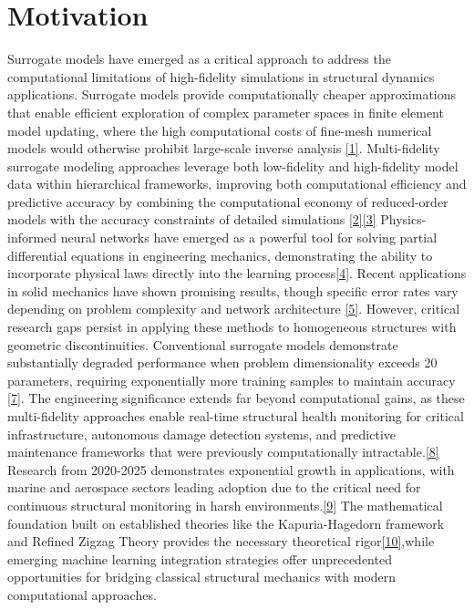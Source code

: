 \documentclass[12pt,a4paper]{report}
\begin{document}
\section{Motivation}
\label{sec:motivation}
Surrogate models have emerged as a critical approach to address the computational limitations of high-fidelity simulations in structural dynamics applications. Surrogate models provide computationally cheaper approximations that enable efficient exploration of complex parameter spaces in finite element model updating, where the high computational costs of fine-mesh numerical models would otherwise prohibit large-scale inverse analysis \href{https://doi.org/10.1155/2019/8086024}{[1]}. Multi-fidelity surrogate modeling approaches leverage both low-fidelity and high-fidelity model data within hierarchical frameworks, improving both computational efficiency and predictive accuracy by combining the computational economy of reduced-order models with the accuracy constraints of detailed simulations \href{https://doi.org/10.1002/eqe.3839}{[2]}\href{https://doi.org/10.1002/2475-8876.70002}{[3]}
 Physics-informed neural networks have emerged as a powerful tool for solving partial differential
  equations in engineering mechanics, demonstrating the ability to incorporate physical laws directly into the
  learning process\href{https://www.sciencedirect.com/science/article/pii/S0021999118307125}{[4]}. Recent applications in solid mechanics have shown promising results, though specific error
   rates vary depending on problem complexity and network architecture \href{https://epubs.siam.org/doi/10.1137/19M1274067}{[5]}. However, critical research gaps persist in applying these methods to homogeneous structures with geometric discontinuities. Conventional surrogate models demonstrate substantially degraded performance when problem dimensionality exceeds 20 parameters, requiring exponentially more training samples to maintain accuracy \href{https://onlinelibrary.wiley.com/doi/10.1002/cnm.2985}{[7]}.  The engineering significance extends far beyond computational gains, as these multi-fidelity approaches enable real-time structural health monitoring for critical infrastructure, autonomous damage detection systems, and predictive maintenance frameworks that were previously computationally intractable.\href{https://www.sciencedirect.com/science/article/pii/S0888327023002832}{[8]}
 Research from 2020-2025 demonstrates exponential growth in applications, with marine and aerospace sectors leading adoption due to the critical need for continuous structural monitoring in harsh environments.\href{https://doi.org/10.3390/s20102778}{[9]}
 The mathematical foundation built on established theories like the Kapuria-Hagedorn framework and Refined Zigzag Theory provides the necessary theoretical rigor\href{http://dx.doi.org/10.2140/jomms.2007.2.1267}{[10]},while emerging machine learning integration strategies offer unprecedented opportunities for bridging classical structural mechanics with modern computational approaches.
\end{document}

